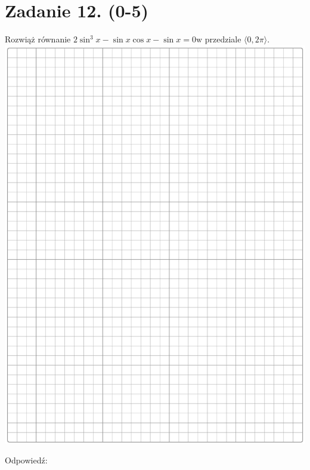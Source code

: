 \documentclass[10pt]{article}
\begin{document}
\section*{Zadanie 12. (0-5)}
Rozwiąż równanie \(2 \sin ^{3} x-\sin x \cos x-\sin x=0 \mathrm{w}\) przedziale \(\langle 0,2 \pi\rangle\).\\
\includegraphics[max width=\textwidth, center]{2024_11_21_e30d1f37bf0e3631c088g-11}

Odpowiedź: \(\qquad\)
\end{document}
